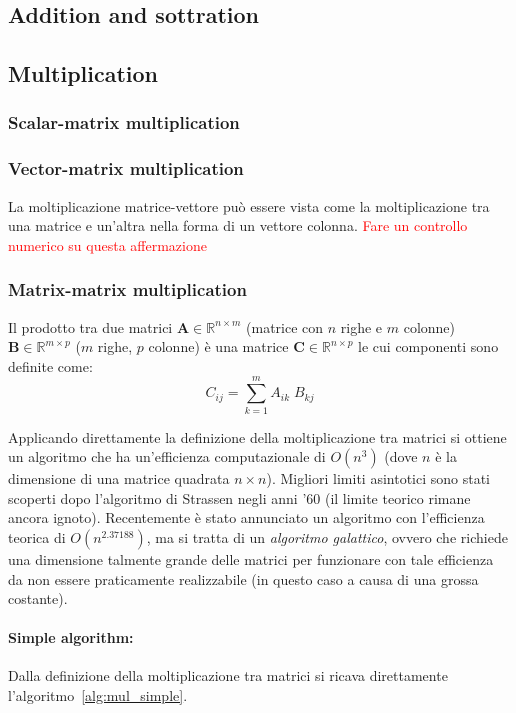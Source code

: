 \documentclass[10pt]{article}
\begin{document}
\subsection{Addition and sottration}

\subsection{Multiplication}

\subsubsection{Scalar-matrix multiplication}
\subsubsection{Vector-matrix multiplication}

La moltiplicazione matrice-vettore può essere vista come la moltiplicazione tra una matrice e un'altra nella forma di un vettore colonna.
\textcolor{red}{Fare un controllo numerico su questa affermazione}

\subsubsection{Matrix-matrix multiplication}

Il prodotto tra due matrici $\mathbf{A} \in \mathbb{R}^{n\times m}$ (matrice con $n$ righe e $m$ colonne) $\mathbf{B} \in \mathbb{R}^{m\times p}$ ($m$ righe, $p$ colonne) è una matrice $\mathbf{C} \in \mathbb{R}^{n\times p}$ le cui componenti sono definite come:
\begin{equation}
C_{ij} = \sum_{k=1}^m A_{ik} \; B_{kj}
\end{equation}

Applicando direttamente la definizione della moltiplicazione tra matrici si ottiene un algoritmo che ha un'efficienza computazionale di $O(n^3)$ (dove $n$ è la dimensione di una matrice quadrata $n\times n$). Migliori limiti asintotici sono stati scoperti dopo l'algoritmo di Strassen negli anni '60 (il limite teorico rimane ancora ignoto). Recentemente è stato annunciato un algoritmo con l'efficienza teorica di $O(n^{2.37188})$, ma si tratta di un \emph{algoritmo galattico}, ovvero che richiede una dimensione talmente grande delle matrici per funzionare con tale efficienza da non essere praticamente realizzabile (in questo caso a causa di una grossa costante).

\paragraph{Simple algorithm:} Dalla definizione della moltiplicazione tra matrici si ricava direttamente l'algoritmo~\ref{alg:mul_simple}.
\end{document}
